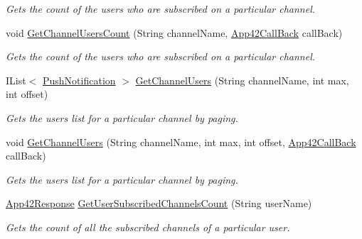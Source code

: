 \begin{DoxyCompactItemize}
\begin{DoxyCompactList}\small\item\em Gets the count of the users who are subscribed on a particular channel. \end{DoxyCompactList}\item 
void \hyperlink{classcom_1_1shephertz_1_1app42_1_1paas_1_1sdk_1_1csharp_1_1push_notification_1_1_push_notification_service_a7fa0a30e5904d6e31790cce98039119f}{Get\+Channel\+Users\+Count} (String channel\+Name, \hyperlink{interfacecom_1_1shephertz_1_1app42_1_1paas_1_1sdk_1_1csharp_1_1_app42_call_back}{App42\+Call\+Back} call\+Back)
\begin{DoxyCompactList}\small\item\em Gets the count of the users who are subscribed on a particular channel. \end{DoxyCompactList}\item 
I\+List$<$ \hyperlink{classcom_1_1shephertz_1_1app42_1_1paas_1_1sdk_1_1csharp_1_1push_notification_1_1_push_notification}{Push\+Notification} $>$ \hyperlink{classcom_1_1shephertz_1_1app42_1_1paas_1_1sdk_1_1csharp_1_1push_notification_1_1_push_notification_service_a083221fd048a6cf69530d498e61f3979}{Get\+Channel\+Users} (String channel\+Name, int max, int offset)
\begin{DoxyCompactList}\small\item\em Gets the users list for a particular channel by paging. \end{DoxyCompactList}\item 
void \hyperlink{classcom_1_1shephertz_1_1app42_1_1paas_1_1sdk_1_1csharp_1_1push_notification_1_1_push_notification_service_a805782a29e900015f633c272c1a23907}{Get\+Channel\+Users} (String channel\+Name, int max, int offset, \hyperlink{interfacecom_1_1shephertz_1_1app42_1_1paas_1_1sdk_1_1csharp_1_1_app42_call_back}{App42\+Call\+Back} call\+Back)
\begin{DoxyCompactList}\small\item\em Gets the users list for a particular channel by paging. \end{DoxyCompactList}\item 
\hyperlink{classcom_1_1shephertz_1_1app42_1_1paas_1_1sdk_1_1csharp_1_1_app42_response}{App42\+Response} \hyperlink{classcom_1_1shephertz_1_1app42_1_1paas_1_1sdk_1_1csharp_1_1push_notification_1_1_push_notification_service_a2ffe6afb5580bc7fa6fdb749085a4021}{Get\+User\+Subscribed\+Channels\+Count} (String user\+Name)
\begin{DoxyCompactList}\small\item\em Gets the count of all the subscribed channels of a particular user. \end{DoxyCompactList}\item 

\end{DoxyCompactItemize}
